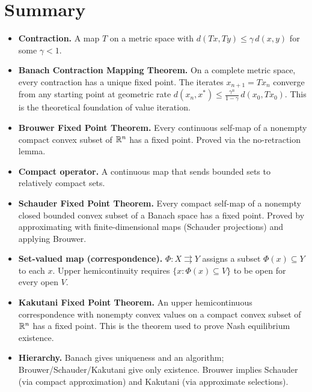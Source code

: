 \documentclass[11pt,a4paper]{article}
\begin{document}

\section{Summary}
\label{sec:summary}

\begin{itemize}[leftmargin=2em,nosep]
    \item \textbf{Contraction.}  A map $T$ on a metric space with
          $d(Tx, Ty) \leq \gamma\, d(x, y)$ for some $\gamma < 1$.

    \item \textbf{Banach Contraction Mapping Theorem.}  On a complete
          metric space, every contraction has a unique fixed point.
          The iterates $x_{n+1} = Tx_n$ converge from any starting
          point at geometric rate
          $d(x_n, x^*) \leq \frac{\gamma^n}{1-\gamma}\, d(x_0, Tx_0)$.
          This is the theoretical foundation of value iteration.

    \item \textbf{Brouwer Fixed Point Theorem.}  Every continuous
          self-map of a nonempty compact convex subset of $\mathbb{R}^n$ has a
          fixed point.  Proved via the no-retraction lemma.

    \item \textbf{Compact operator.}  A continuous map that sends
          bounded sets to relatively compact sets.

    \item \textbf{Schauder Fixed Point Theorem.}  Every compact
          self-map of a nonempty closed bounded convex subset of a
          Banach space has a fixed point.  Proved by approximating
          with finite-dimensional maps (Schauder projections) and
          applying Brouwer.

    \item \textbf{Set-valued map (correspondence).}
          $\Phi \colon X \rightrightarrows Y$ assigns a subset
          $\Phi(x) \subseteq Y$ to each $x$.  Upper hemicontinuity
          requires $\{x : \Phi(x) \subseteq V\}$ to be open for
          every open $V$.

    \item \textbf{Kakutani Fixed Point Theorem.}  An upper
          hemicontinuous correspondence with nonempty convex values on
          a compact convex subset of $\mathbb{R}^n$ has a fixed point.  This
          is the theorem used to prove Nash equilibrium existence.

    \item \textbf{Hierarchy.}  Banach gives uniqueness and an
          algorithm; Brouwer/Schauder/Kakutani give only existence.
          Brouwer implies Schauder (via compact approximation) and
          Kakutani (via approximate selections).
\end{itemize}
\end{document}
